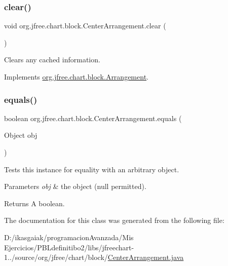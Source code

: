 \subsubsection{\texorpdfstring{clear()}{clear()}}
{\footnotesize\ttfamily void org.\+jfree.\+chart.\+block.\+Center\+Arrangement.\+clear (\begin{DoxyParamCaption}{ }\end{DoxyParamCaption})}

Clears any cached information. 

Implements \mbox{\hyperlink{interfaceorg_1_1jfree_1_1chart_1_1block_1_1_arrangement_a4db8248d65d1c074b7cf5ecc35d0f097}{org.\+jfree.\+chart.\+block.\+Arrangement}}.

\mbox{\label{classorg_1_1jfree_1_1chart_1_1block_1_1_center_arrangement_a2de2257dc38240ac76922830f681b9a2}} 
\subsubsection{\texorpdfstring{equals()}{equals()}}
{\footnotesize\ttfamily boolean org.\+jfree.\+chart.\+block.\+Center\+Arrangement.\+equals (\begin{DoxyParamCaption}\item[{Object}]{obj }\end{DoxyParamCaption})}

Tests this instance for equality with an arbitrary object.


\begin{DoxyParams}{Parameters}
{\em obj} & the object ({\ttfamily null} permitted).\\
\hline
\end{DoxyParams}
\begin{DoxyReturn}{Returns}
A boolean. 
\end{DoxyReturn}


The documentation for this class was generated from the following file\+:\begin{DoxyCompactItemize}
\item 
D\+:/ikasgaiak/programacion\+Avanzada/\+Mis Ejercicios/\+P\+B\+Ldefinitibo2/libs/jfreechart-\/1../source/org/jfree/chart/block/\mbox{\hyperlink{_center_arrangement_8java}{Center\+Arrangement.\+java}}\end{DoxyCompactItemize}
